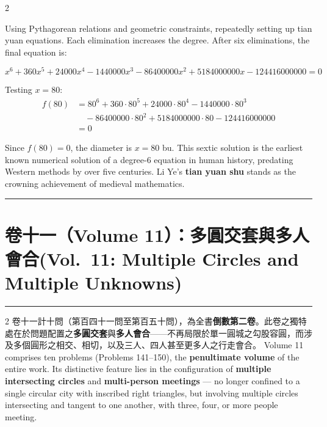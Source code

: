 \documentclass[11pt,a4paper]{article}
\newcommand{\longline}{\noindent\rule{\textwidth}{0.4pt}}
\newcommand{\shortline}{\noindent\rule{0.5\textwidth}{0.4pt}\par}
\newcommand{\bilingualsection}[2]{\section*{#1\quad(#2)}}
\begin{document}
\begin{paracol}{2}
{Using Pythagorean relations and geometric constraints, repeatedly setting up tian yuan equations. Each elimination increases the degree. After six eliminations, the final equation is:

$$x^6 + 360x^5 + 24000x^4 - 1440000x^3 - 86400000x^2 + 5184000000x - 124416000000 = 0$$

Testing $x = 80$:
\begin{align*}
f(80) &= 80^6 + 360 \cdot 80^5 + 24000 \cdot 80^4 - 1440000 \cdot 80^3 \\
&\quad - 86400000 \cdot 80^2 + 5184000000 \cdot 80 - 124416000000 \\
&= 0
\end{align*}

Since $f(80) = 0$, the diameter is $x = 80$ bu. This sextic solution is the earliest known numerical solution of a degree-6 equation in human history, predating Western methods by over five centuries. Li Ye's \textbf{tian yuan shu} stands as the crowning achievement of medieval mathematics.}
\end{paracol}

\vspace{0.4cm}
\begin{center}
\shortline
\end{center}
\vspace{0.3cm}

\newpage
\bilingualsection{卷十一（Volume 11）：多圓交套與多人會合}{Vol.\ 11: Multiple Circles and Multiple Unknowns}

\longline

\begin{paracol}{2}
卷十一計十問（第百四十一問至第百五十問），為全書\textbf{倒數第二卷}。此卷之獨特處在於問題配置之\textbf{多圓交套}與\textbf{多人會合}——不再局限於單一圓城之勾股容圓，而涉及多個圓形之相交、相切，以及三人、四人甚至更多人之行走會合。
\switchcolumn
Volume 11 comprises ten problems (Problems 141--150), the \textbf{penultimate volume} of the entire work. Its distinctive feature lies in the configuration of \textbf{multiple intersecting circles} and \textbf{multi-person meetings} --- no longer confined to a single circular city with inscribed right triangles, but involving multiple circles intersecting and tangent to one another, with three, four, or more people meeting.
\end{paracol}
\end{document}
